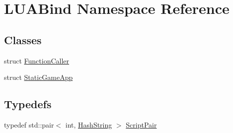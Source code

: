 \hypertarget{namespaceLUABind}{}\section{L\+U\+A\+Bind Namespace Reference}
\label{namespaceLUABind}
\subsection*{Classes}
\begin{DoxyCompactItemize}
\item 
struct \hyperlink{structLUABind_1_1FunctionCaller}{Function\+Caller}
\item 
struct \hyperlink{structLUABind_1_1StaticGameApp}{Static\+Game\+App}
\end{DoxyCompactItemize}
\subsection*{Typedefs}
\begin{DoxyCompactItemize}
\item 
typedef std\+::pair$<$ int, \hyperlink{classHashString}{Hash\+String} $>$ \hyperlink{namespaceLUABind_a8c953e7cbebaf43f533bf2fd4a9a32bd}{Script\+Pair}
\end{DoxyCompactItemize}
